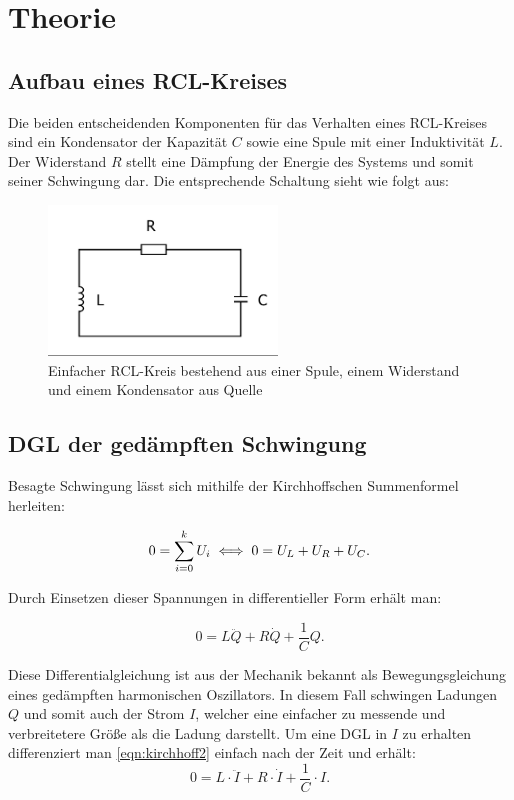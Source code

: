 \section{Theorie}
\label{sec:Theorie}
\subsection{Aufbau eines RCL-Kreises}
Die beiden entscheidenden Komponenten für das Verhalten eines RCL-Kreises sind ein Kondensator der Kapazität $C$ sowie eine Spule mit einer Induktivität $L$.
Der Widerstand $R$ stellt eine Dämpfung der Energie des Systems und somit seiner Schwingung dar. Die entsprechende Schaltung sieht wie folgt aus:

\begin{figure}
  \centering
  \includegraphics[height= 4cm]{./logos/schwingkreis.png}
  \caption{Einfacher RCL-Kreis bestehend aus einer Spule, einem Widerstand und einem Kondensator
  aus Quelle \cite{sample}}
  \label{fig:rcl}
\end{figure}


\subsection{DGL der gedämpften Schwingung}
Besagte Schwingung lässt sich mithilfe der Kirchhoffschen Summenformel herleiten:

\begin{equation}
  0= \sum_{i=0}^{k} U_i \\
  \iff  0 = U_L + U_R + U_C .
  \label{eqn:kirchhoff1}
\end{equation}

Durch Einsetzen dieser Spannungen in differentieller Form erhält man:

\begin{equation}
  0= L\ddot{Q} + R  \dot{Q} + \frac{1}{C} Q .
  \label{eqn:kirchhoff2}
\end{equation}

Diese Differentialgleichung ist aus der Mechanik bekannt als Bewegungsgleichung eines gedämpften harmonischen Oszillators.
In diesem Fall schwingen Ladungen $Q$ und somit auch der Strom $I$, welcher eine einfacher zu messende und verbreitetere Größe als die Ladung darstellt.
Um eine DGL in $I$ zu erhalten differenziert man \eqref{eqn:kirchhoff2} einfach nach der Zeit und erhält:
\begin{equation}
  0= L \cdot \ddot{I} + R \cdot \dot{I} + \frac{1}{C} \cdot I .
  \label{eqn:kirchhoff3}
\end{equation}


